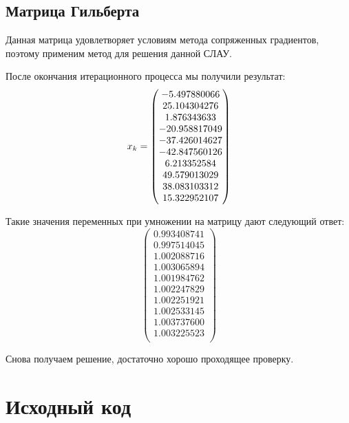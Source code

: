 \documentclass[../../report.tex]{subfiles}
\begin{document}
\subsection{Матрица Гильберта}
Данная матрица удовлетворяет условиям метода сопряженных градиентов, поэтому применим
метод для решения данной СЛАУ.

После окончания итерационного процесса мы получили результат:
\[
x_{k} = \begin{pmatrix} -5.497880066 \\ 25.104304276 \\ 1.876343633 \\ -20.958817049 \\ -37.426014627 \\ -42.847560126 \\ 6.213352584 \\ 49.579013029 \\ 38.083103312 \\ 15.322952107 \\ \end{pmatrix}
\]

Такие значения переменных при умножении на матрицу дают следующий ответ:
\[
\begin{pmatrix}
    0.993408741 \\
    0.997514045 \\
    1.002088716 \\
    1.003065894 \\
    1.001984762 \\
    1.002247829 \\
    1.002251921 \\
    1.002533145 \\
    1.003737600 \\
    1.003225523 \\
\end{pmatrix}
\]

Снова получаем решение, достаточно хорошо проходящее проверку.

\section{Исходный код}
\end{document}
